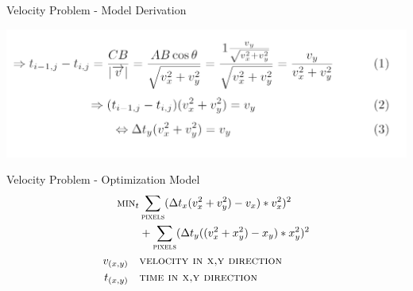 \documentclass[presentation]{beamer}
\begin{document}
\begin{frame}[label={sec:org03d5ffb}]{Velocity Problem - Model Derivation}
\begin{center}
\includegraphics[width=.9\linewidth]{figs/velocityderivation.png}
\end{center}
\end{frame}
\begin{frame}[label={sec:org06e74f7}]{Velocity Problem - Optimization Model}
\begin{align*}
\textsc{min}_t &\sum_{\textsc{pixels}} (\Delta t_x (v_x^2 + v_y^2) - v_x) * v_x^2)^2  \\
               & + \sum_{\textsc{pixels}} (\Delta t_y ((v_x^2 + x_y^2) - x_y) * x_y^2)^2 \\
v_{(x,y)} \quad & \textsc{velocity in x,y direction} \\
t_{(x,y)} \quad & \textsc{time in x,y direction}
\end{align*}
\end{frame}
\end{document}
